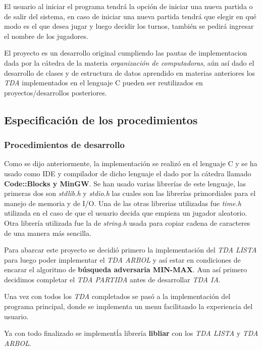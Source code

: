 \documentclass[12pt,a4paper]{article}
\begin{document}
    El usuario al iniciar el programa tendr\'a la opci\'on de iniciar una nueva partida o de salir del sistema, en caso de iniciar una nueva partida tendr\'a que elegir en qu\'e modo es el que desea jugar y luego decidir los turnos, tambi\'en se pedir\'a ingresar el nombre de los jugadores.

    El proyecto es un desarrollo original cumpliendo las pautas de implementacion dada por la c\'atedra de la materia {\itshape organizaci\'on de computadoras}, a\'un as\'i dado el desarrollo de clases y de estructura de datos aprendido en materias anteriores los {\itshape TDA} implementados en el lenguaje C pueden ser reutilizados en proyectos/desarrollos posteriores.

\subsection{Especificaci\'on de los procedimientos}

\subsubsection{Procedimientos de desarrollo}
    Como se dijo anteriormente, la implementaci\'on se realiz\'o en el lenguaje C y se ha usado como IDE y compilador de dicho lenguaje el dado por la c\'atedra llamado {\bf Code::Blocks y MinGW}. Se han usado varias librer\'ias de este lenguaje, las primeras dos son {\itshape stdlib.h} y {\itshape stdio.h} las cuales son las librer\'ias primordiales para el manejo de memoria y de I/O. Una de las otras librerias utilizadas fue {\itshape time.h} utilizada en el caso de que el usuario decida que empieza un jugador aleatorio. Otra librer\'ia utilizada fue la de {\itshape string.h} usada para copiar cadena de caracteres de una manera m\'as sencilla.

    Para abarcar este proyecto se decidi\'o primero la implementaci\'on del {\itshape TDA LISTA} para luego poder implementar el {\itshape TDA ARBOL} y as\'i estar en condiciones de encarar el algoritmo de {\bf b\'usqueda adversaria MIN-MAX}. Aun as\'i primero decidimos completar el {\itshape TDA PARTIDA} antes de desarrollar {\itshape TDA IA}.

    Una vez con todos los {\itshape TDA} completados se pas\'o a la implementaci\'on del programa principal, donde se implementa un menu facilitando la experiencia del usuario.

    Ya con todo finalizado se implement\' la librer\'ia {\bf libliar} con los {\itshape TDA LISTA} y {\itshape TDA ARBOL}.
\end{document}
